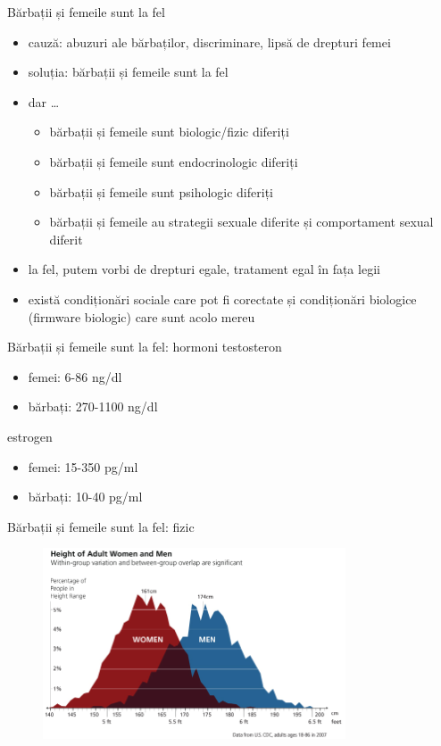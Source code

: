 \documentclass{beamer}
\begin{document}
\begin{frame}{Bărbații și femeile sunt la fel}
  \begin{itemize}
    \pause \item cauză: abuzuri ale bărbaților, discriminare, lipsă de drepturi femei
    \pause \item soluția: bărbații și femeile sunt la fel
    \pause \item dar \ldots
      \begin{itemize}
        \pause \item bărbații și femeile sunt biologic/fizic diferiți
        \pause \item bărbații și femeile sunt endocrinologic diferiți
        \pause \item bărbații și femeile sunt psihologic diferiți
        \pause \item bărbații și femeile au strategii sexuale diferite și comportament sexual diferit
      \end{itemize}
    \pause \item la fel, putem vorbi de drepturi egale, tratament egal în fața legii
    \pause \item există condiționări sociale care pot fi corectate și condiționări biologice (firmware biologic) care sunt acolo mereu
  \end{itemize}
\end{frame}

\begin{frame}{Bărbații și femeile sunt la fel: hormoni}
  \pause testosteron \\
  \begin{itemize}
    \pause \item femei: 6-86 ng/dl
    \pause \item bărbați: 270-1100 ng/dl
  \end{itemize}
  \pause estrogen \\
  \begin{itemize}
    \pause \item femei: 15-350 pg/ml
    \pause \item bărbați: 10-40 pg/ml
  \end{itemize}
\end{frame}

\begin{frame}{Bărbații și femeile sunt la fel: fizic}
  \centering
  \begin{figure}
    \includegraphics[width=0.8\textwidth]{img/male-female-height}
  \end{figure}
\end{frame}
\end{document}
